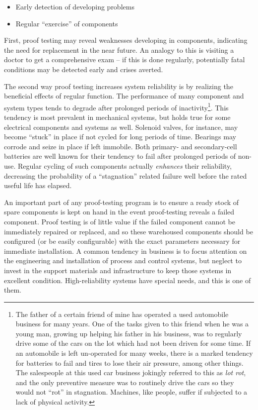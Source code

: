 \begin{itemize}
\item Early detection of developing problems
\item Regular ``exercise'' of components
\end{itemize}

First, proof testing may reveal weaknesses developing in components, indicating the need for replacement in the near future.  An analogy to this is visiting a doctor to get a comprehensive exam -- if this is done regularly, potentially fatal conditions may be detected early and crises averted.

The second way proof testing increases system reliability is by realizing the beneficial effects of regular function.  The performance of many component and system types tends to degrade after prolonged periods of inactivity\footnote{The father of a certain friend of mine has operated a used automobile business for many years.  One of the tasks given to this friend when he was a young man, growing up helping his father in his business, was to regularly drive some of the cars on the lot which had not been driven for some time.  If an automobile is left un-operated for many weeks, there is a marked tendency for batteries to fail and tires to lose their air pressure, among other things.  The salespeople at this used car business jokingly referred to this as \textit{lot rot}, and the only preventive measure was to routinely drive the cars so they would not ``rot'' in stagnation.  Machines, like people, suffer if subjected to a lack of physical activity.}.  This tendency is most prevalent in mechanical systems, but holds true for some electrical components and systems as well.  Solenoid valves, for instance, may become ``stuck'' in place if not cycled for long periods of time.  Bearings may corrode and seize in place if left immobile.  Both primary- and secondary-cell batteries are well known for their tendency to fail after prolonged periods of non-use.  Regular cycling of such components actually \textit{enhances} their reliability, decreasing the probability of a ``stagnation'' related failure well before the rated useful life has elapsed. 

An important part of any proof-testing program is to ensure a ready stock of spare components is kept on hand in the event proof-testing reveals a failed component.  Proof testing is of little value if the failed component cannot be immediately repaired or replaced, and so these warehoused components should be configured (or be easily configurable) with the exact parameters necessary for immediate installation.  A common tendency in business is to focus attention on the engineering and installation of process and control systems, but neglect to invest in the support materials and infrastructure to keep those systems in excellent condition.  High-reliability systems have special needs, and this is one of them.




